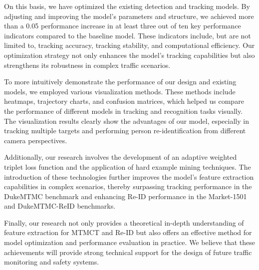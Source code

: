 \begin{abstracten}

On this basis, we have optimized the existing detection and tracking models. By adjusting and improving the model's parameters and structure, we achieved more than a 0.05 performance increase in at least three out of ten key performance indicators compared to the baseline model. These indicators include, but are not limited to, tracking accuracy, tracking stability, and computational efficiency. Our optimization strategy not only enhances the model's tracking capabilities but also strengthens its robustness in complex traffic scenarios.

To more intuitively demonstrate the performance of our design and existing models, we employed various visualization methods. These methods include heatmaps, trajectory charts, and confusion matrices, which helped us compare the performance of different models in tracking and recognition tasks visually. The visualization results clearly show the advantages of our model, especially in tracking multiple targets and performing person re-identification from different camera perspectives.

Additionally, our research involves the development of an adaptive weighted triplet loss function and the application of hard example mining techniques. The introduction of these technologies further improves the model's feature extraction capabilities in complex scenarios, thereby surpassing tracking performance in the DukeMTMC benchmark and enhancing Re-ID performance in the Market-1501 and DukeMTMC-ReID benchmarks.

Finally, our research not only provides a theoretical in-depth understanding of feature extraction for MTMCT and Re-ID but also offers an effective method for model optimization and performance evaluation in practice. We believe that these achievements will provide strong technical support for the design of future traffic monitoring and safety systems.



\end{abstracten}